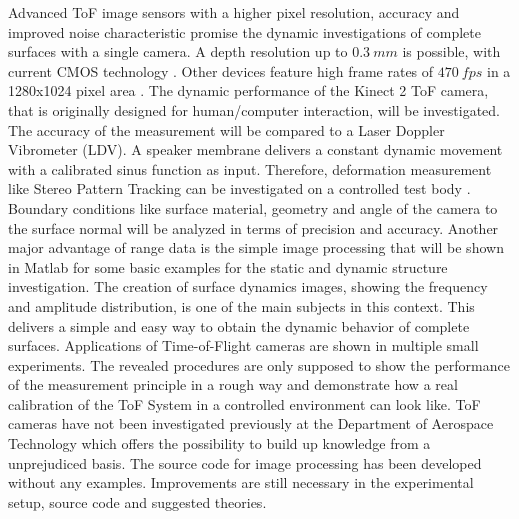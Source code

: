  Advanced ToF image sensors with a higher pixel resolution, accuracy and improved noise characteristic promise the dynamic investigations of complete surfaces with a single camera. A depth resolution up to $0.3~mm$ is possible, with current CMOS technology \cite{yasutomi20147}. Other devices feature high frame rates of $470~fps$ in a 1280x1024 pixel area \cite{odosimagingdatasheet}. The dynamic performance of the Kinect 2 ToF camera, that is originally designed for human/computer interaction, will be investigated. The accuracy of the measurement will be compared to a Laser Doppler Vibrometer (LDV). A speaker membrane delivers a constant dynamic movement with a calibrated sinus function as input. Therefore, deformation measurement like Stereo Pattern Tracking can be investigated on a controlled test body \cite{mantik2013enhancement}. Boundary conditions like surface material, geometry and angle of the camera to the surface normal will be analyzed in terms of precision and accuracy. Another major advantage of range data is the simple image processing that will be shown in Matlab for some basic examples for the static and dynamic structure investigation. The creation of surface dynamics images, showing the frequency and amplitude distribution, is one of the main subjects in this context. This delivers a simple and easy way to obtain the dynamic behavior of complete surfaces. Applications of Time-of-Flight cameras are shown in multiple small experiments. The revealed procedures are only supposed to show the performance of the measurement principle in a rough way and demonstrate how a real calibration of the ToF System in a controlled environment can look like. ToF cameras have not been investigated previously at the Department of Aerospace Technology which offers the possibility to build up knowledge from a unprejudiced basis. The source code for image processing has been developed without any examples. Improvements are still necessary in the experimental setup, source code and suggested theories.     